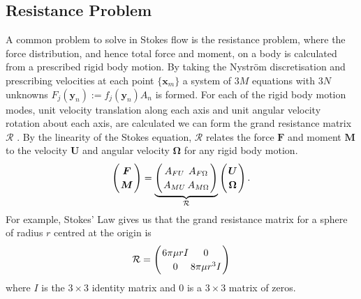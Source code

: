 \subsection{Resistance Problem} \label{sec:resistance}
A common problem to solve in Stokes flow is the resistance problem, where the force distribution, and hence total force and moment, on a body is calculated from a prescribed rigid body motion. By taking the Nyström discretisation
and prescribing velocities at each point $\{\bm{x}_m\}$ a system of $3M$ equations with $3N$ unknowns $F_j(\bm{y}_n) := f_j(\bm{y}_n)A_n$ is formed. For each of the rigid body motion modes, unit velocity translation along each axis and unit angular velocity rotation about each axis, are calculated we can form the grand resistance matrix $\mathcal{R}$ \cite{Pozrikidis1992BoundaryFlow}. By the linearity of the Stokes equation, $\mathcal{R}$ relates the force $\mathbf{F}$ and moment $\mathbf{M}$ to the velocity $\mathbf{U}$ and angular velocity $\mathbf{\Omega}$ for any rigid body motion. 
\begin{equation}
\arraycolsep=1pt\def\arraystretch{1.2}
\left(
\begin{array}{c}
\boldsymbol{F} \\
\boldsymbol{M}
\end{array}\right)=\underbrace{\left(\begin{array}{cc}
A_{F U} & A_{F \Omega} \\
A_{M U} & A_{M \Omega}
\end{array}\right)}_{\mathcal{R}}\left(\begin{array}{c}
\boldsymbol{U} \\
\boldsymbol{\Omega}
\end{array}\right) .
\label{eq:GrandResistance}
\end{equation}
 For example, Stokes' Law gives us that the grand resistance matrix for a sphere of radius $r$ centred at the origin is
 \begin{equation}
\arraycolsep=1pt\def\arraystretch{1.2}
\mathcal{R}=\left(\begin{array}{cc}
6\pi\mu r I & 0 \\
0 & 8\pi\mu r^3 I
\end{array}\right)
\label{eq:sphereres}
\end{equation}
where $I$ is the $3\times 3$ identity matrix and $0$ is a $3\times 3$ matrix of zeros.

